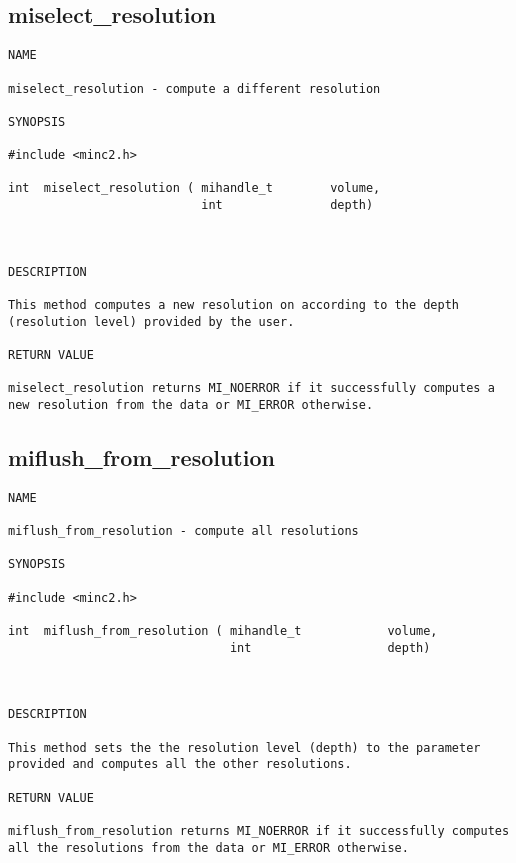 \documentclass{article}
\begin{document}
\subsection{miselect\_resolution}
\begin{verbatim}
NAME 

miselect_resolution - compute a different resolution

SYNOPSIS

#include <minc2.h>

int  miselect_resolution ( mihandle_t        volume,
                           int               depth)
                                   
                       
                                
DESCRIPTION

This method computes a new resolution on according to the depth 
(resolution level) provided by the user. 

RETURN VALUE

miselect_resolution returns MI_NOERROR if it successfully computes a
new resolution from the data or MI_ERROR otherwise.
\end{verbatim}

\subsection{miflush\_from\_resolution}
\begin{verbatim}
NAME 

miflush_from_resolution - compute all resolutions

SYNOPSIS

#include <minc2.h>

int  miflush_from_resolution ( mihandle_t            volume,
                               int                   depth)
                                   
                       
                                
DESCRIPTION

This method sets the the resolution level (depth) to the parameter
provided and computes all the other resolutions.

RETURN VALUE

miflush_from_resolution returns MI_NOERROR if it successfully computes 
all the resolutions from the data or MI_ERROR otherwise.
\end{verbatim}
\end{document}
